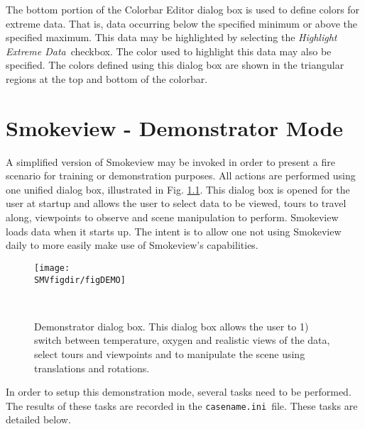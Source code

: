 \documentclass[11pt,twoside]{book}
\begin{document}
The bottom portion of the Colorbar Editor dialog box is
used to define colors for extreme data.  That is, data occurring
below the specified minimum or above the specified maximum.  This
data may be highlighted by selecting the {\em Highlight Extreme
Data}\ checkbox. The color used to highlight this data may also be
specified.  The colors defined using this dialog box are shown in
the triangular regions at the top and bottom of the colorbar.

\chapter{Smokeview - Demonstrator Mode}
A simplified version of Smokeview may be invoked in order to present a fire
scenario for training or demonstration
purposes.  All actions are performed using one unified dialog box,
illustrated in Fig. \ref{figDEMO}.  This dialog box is opened for the
user at startup and allows the user to select data to be viewed, tours to
travel along, viewpoints to observe and scene manipulation to perform.
Smokeview loads data when it starts up.
The intent is to allow one not using Smokeview daily to more easily
make use of Smokeview's capabilities.


\begin{figure}[bph]
\begin{center}
\texttt{[image: \\SMVfigdir/figDEMO]}
\end{center}
\caption[Demonstrator dialog box.]{Demonstrator dialog box.
This dialog box allows the user to 1) switch between temperature,
oxygen and realistic views of the data,
select tours and viewpoints
 and to manipulate the scene using translations and rotations.}\ \label{figDEMO}
\end{figure}

In order to setup this demonstration mode, several tasks need to be performed.
The results of these tasks are
recorded in the {\tt casename.ini}\ file.
These tasks are detailed below.
\end{document}
